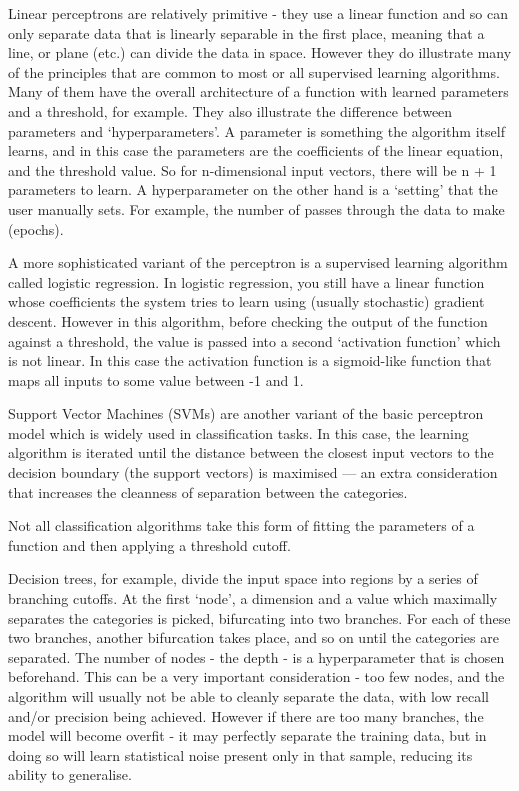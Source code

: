 Linear perceptrons are relatively primitive - they use a linear function and so can only separate data that is linearly separable in the first place, meaning that a line, or plane (etc.) can divide the data in space. However they do illustrate many of the principles that are common to most or all supervised learning algorithms. Many of them have the overall architecture of a function with learned parameters and a threshold, for example. They also illustrate the difference between parameters and `hyperparameters'. A parameter is something the algorithm itself learns, and in this case the parameters are the coefficients of the linear equation, and the threshold value. So for n-dimensional input vectors, there will be n + 1 parameters to learn. A hyperparameter on the other hand is a `setting' that the user manually sets. For example, the number of passes through the data to make (epochs).

A more sophisticated variant of the perceptron is a supervised learning algorithm called logistic regression. In logistic regression, you still have a linear function whose coefficients the system tries to learn using (usually stochastic) gradient descent. However in this algorithm, before checking the output of the function against a threshold, the value is passed into a second `activation function' which is not linear. In this case the activation function is a sigmoid-like function that maps all inputs to some value between -1 and 1.

Support Vector Machines (SVMs) are another variant of the basic perceptron model which is widely used in classification tasks. In this case, the learning algorithm is iterated until the distance between the closest input vectors to the decision boundary (the support vectors) is maximised --- an extra consideration that increases the cleanness of separation between the categories.

Not all classification algorithms take this form of fitting the parameters of a function and then applying a threshold cutoff.

Decision trees, for example, divide the input space into regions by a series of branching cutoffs. At the first `node', a dimension and a value which maximally separates the categories is picked, bifurcating into two branches. For each of these two branches, another bifurcation takes place, and so on until the categories are separated. The number of nodes - the depth - is a hyperparameter that is chosen beforehand. This can be a very important consideration - too few nodes, and the algorithm will usually not be able to cleanly separate the data, with low recall and/or precision being achieved. However if there are too many branches, the model will become overfit - it may perfectly separate the training data, but in doing so will learn statistical noise present only in that sample, reducing its ability to generalise.

